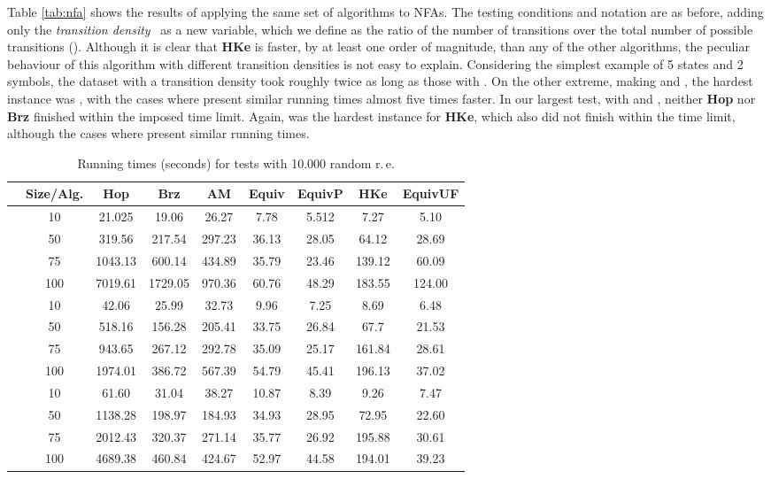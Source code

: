 \documentclass[copyright]{eptcs}
\newcommand{\nfas}{NFAs\xspace}
\newcommand{\re}{r.\,e.\xspace}
\newcommand{\hop}{\textbf{Hop}\xspace}
\newcommand{\hke}{\textbf{HKe}\xspace}
\newcommand{\brz}{\textbf{Brz}\xspace}
\begin{document}
Table \ref{tab:nfa} shows the results of applying the same set of
algorithms to \nfas. The testing conditions and notation are as
before, adding only the \emph{transition density}~ as a new
variable, which we define as the ratio of the number of transitions
over the total number of possible transitions (). Although it is
clear that \hke is faster, by at least one order of magnitude, than
any of the other algorithms, the peculiar behaviour of this algorithm
with different transition densities is not easy to
explain. Considering the simplest example of 5 states and 2 symbols,
the dataset with a transition density  took roughly twice as
long as those with . On the other extreme, making
 and , the hardest instance was , with the cases
where  present similar running times almost five
times faster. In our largest test, with  and , neither
\hop nor \brz finished within the imposed time limit. Again, 
was the hardest instance for \hke, which also did not finish within
the time limit, although the cases where  present
similar running times.

\begin{table}[ht]
  \caption{Running times (seconds) for tests with 10.000 random \re}
  \label{tab:re}
  \centering
  \footnotesize
  \begin{tabular}[h]{|l|c|c|c|c|c|c|c|c|}
    \hline
    &\textbf{Size/Alg.}	&\textbf{Hop} &\textbf{Brz} &\textbf{AM} &\textbf{Equiv} &\textbf{EquivP} &\textbf{HKe} &\textbf{EquivUF} \\
\hline
    &10	&21.025	&19.06	&26.27	&7.78	&5.512	&7.27 &5.10 \\
    &50	&319.56	&217.54	&297.23	&36.13	&28.05	&64.12 &28.69 \\
    &75	&1043.13	&600.14	&434.89	&35.79	&23.46	&139.12 &60.09 \\
    &100	&7019.61	&1729.05	&970.36	&60.76	&48.29	&183.55 &124.00 \\
    \hline
&10	&42.06	&25.99	&32.73	&9.96	&7.25	&8.69 &6.48 \\
    &50	&518.16	&156.28	&205.41	&33.75	&26.84	&67.7 &21.53 \\
    &75	&943.65	&267.12	&292.78	&35.09	&25.17 &161.84 &28.61 \\
    &100	&1974.01	&386.72	&567.39	&54.79	&45.41	&196.13 &37.02 \\
    \hline
&10	&61.60	&31.04	&38.27	&10.87	&8.39	&9.26 &7.47 \\
    &50	&1138.28	&198.97	&184.93	&34.93	&28.95	&72.95 &22.60 \\
    &75	&2012.43	&320.37	&271.14	&35.77	&26.92	&195.88 &30.61 \\
    &100	&4689.38	&460.84	&424.67	&52.97	&44.58	&194.01 &39.23 \\
    \hline
  \end{tabular}
\end{table}
\end{document}
